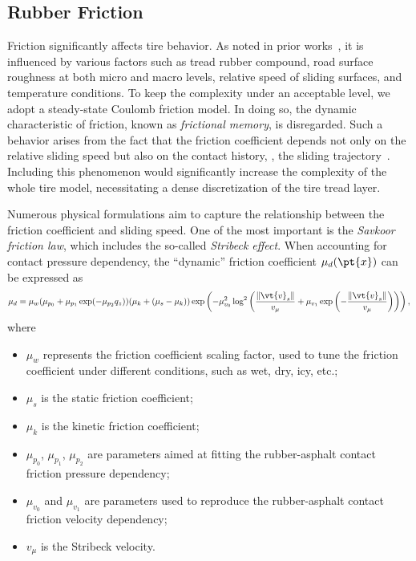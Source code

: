 
\subsection{Rubber Friction}
\label{app3:sec:rubber_friction}

Friction significantly affects tire behavior. As noted in prior works~\cite{selig2014rubber, savkoor1965friction, savkoor1987dry, tiwari2017rubber}, it is influenced by various factors such as tread rubber compound, road surface roughness at both micro and macro levels, relative speed of sliding surfaces, and temperature conditions. To keep the complexity under an acceptable level, we adopt a steady-state Coulomb friction model. In doing so, the dynamic characteristic of friction,  known as \emph{frictional memory}, is disregarded. Such a behavior arises from the fact that the friction coefficient depends not only on the relative sliding speed but also on the contact history, \ie{}, the sliding trajectory~\cite{persson2010rubber}. Including this phenomenon would significantly increase the complexity of the whole tire model, necessitating a dense discretization of the tire tread layer.

Numerous physical formulations aim to capture the relationship between the friction coefficient and sliding speed. One of the most important is the \emph{Savkoor friction law}, which includes the so-called \emph{Stribeck effect}. When accounting for contact pressure dependency, the ``dynamic'' friction coefficient $\mu_d(\pt{x})$ can be expressed as
%
\begin{equation}
  \mu_d = \mu_w (\mu_{p_0} + \mu_{p_1} \exp( -\mu_{p_2} q_z )) (\mu_k + (\mu_s - \mu_k)) \exp\left( -\mu_{v_0}^2 \log^2 \left( \dfrac{\|\vt{v}_s\|}{v_\mu} + \mu_{v_1} \exp\left(-\dfrac{\|\vt{v}_s\|}{v_\mu}\right)\right)\right),
\end{equation}
%
where
%
\begin{itemize}
  \setlength{\itemsep}{0pt}
  \item $\mu_w$ represents the friction coefficient scaling factor, used to tune the friction coefficient under different conditions, such as wet, dry, icy, etc.;
  \item $\mu_s$ is the static friction coefficient;
  \item $\mu_k$ is the kinetic friction coefficient;
  \item $\mu_{p_0}$, $\mu_{p_1}$, $\mu_{p_2}$ are parameters aimed at fitting the rubber-asphalt contact friction pressure dependency;
  \item $\mu_{v_0}$ and $\mu_{v_1}$ are parameters used to reproduce the rubber-asphalt contact friction velocity dependency;
  \item $v_\mu$ is the Stribeck velocity.
\end{itemize}

